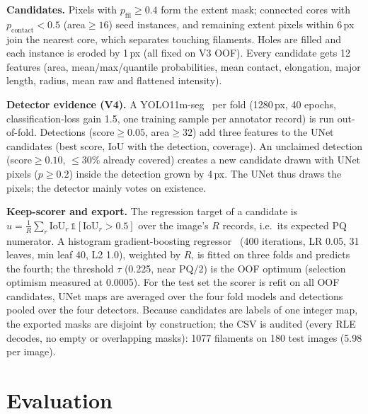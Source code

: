 \documentclass[sigconf]{acmart}
\begin{document}
\textbf{Candidates.} Pixels with $p_{\mathrm{fil}}\ge0.4$ form the extent mask; connected cores with $p_{\mathrm{contact}}<0.5$ (area${\ge}16$) seed instances, and remaining extent pixels within 6\,px join the nearest core, which separates touching filaments. Holes are filled and each instance is eroded by 1\,px (all fixed on V3 OOF). Every candidate gets 12 features (area, mean/max/quantile probabilities, mean contact, elongation, major length, radius, mean raw and flattened intensity).

\textbf{Detector evidence (V4).} A YOLO11m-seg~\cite{jocher2024yolo11} per fold (1280\,px, 40 epochs, classification-loss gain 1.5, one training sample per annotator record) is run out-of-fold. Detections (score${\ge}0.05$, area${\ge}32$) add three features to the UNet candidates (best score, IoU with the detection, coverage). An unclaimed detection (score${\ge}0.10$, ${\le}30\%$ already covered) creates a new candidate drawn with UNet pixels ($p{\ge}0.2$) inside the detection grown by 4\,px. The UNet thus draws the pixels; the detector mainly votes on existence.

\textbf{Keep-scorer and export.} The regression target of a candidate is $u=\frac1R\sum_{r}\mathrm{IoU}_r\,\mathbb{1}[\mathrm{IoU}_r{>}0.5]$ over the image's $R$ records, i.e.\ its expected PQ numerator. A histogram gradient-boosting regressor~\cite{pedregosa2011sklearn} (400 iterations, LR 0.05, 31 leaves, min leaf 40, L2 1.0), weighted by $R$, is fitted on three folds and predicts the fourth; the threshold $\tau$ (0.225, near $\mathrm{PQ}/2$) is the OOF optimum (selection optimism measured at 0.0005). For the test set the scorer is refit on all OOF candidates, UNet maps are averaged over the four fold models and detections pooled over the four detectors. Because candidates are labels of one integer map, the exported masks are disjoint by construction; the CSV is audited (every RLE decodes, no empty or overlapping masks): 1077 filaments on 180 test images (5.98 per image).

\section{Evaluation}\label{sec:evaluation}
\end{document}

